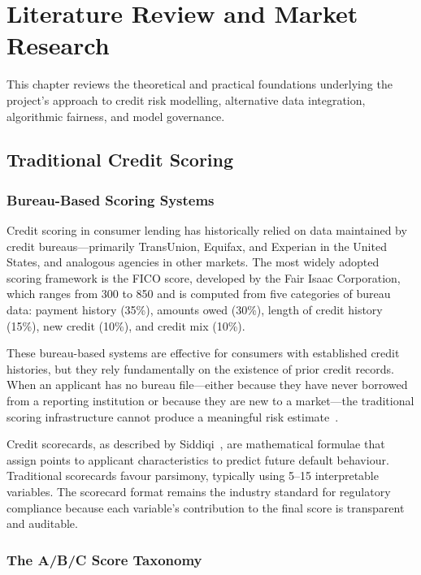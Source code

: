 \chapter{Literature Review and Market Research}
\label{chap:litreview}

This chapter reviews the theoretical and practical foundations underlying the project's approach to credit risk modelling, alternative data integration, algorithmic fairness, and model governance.

\section{Traditional Credit Scoring}
\label{sec:traditional_scoring}

\subsection{Bureau-Based Scoring Systems}

Credit scoring in consumer lending has historically relied on data maintained by credit bureaus---primarily TransUnion, Equifax, and Experian in the United States, and analogous agencies in other markets. The most widely adopted scoring framework is the FICO score, developed by the Fair Isaac Corporation, which ranges from 300 to 850 and is computed from five categories of bureau data: payment history (35\%), amounts owed (30\%), length of credit history (15\%), new credit (10\%), and credit mix (10\%).

These bureau-based systems are effective for consumers with established credit histories, but they rely fundamentally on the existence of prior credit records. When an applicant has no bureau file---either because they have never borrowed from a reporting institution or because they are new to a market---the traditional scoring infrastructure cannot produce a meaningful risk estimate~\cite{cfpb2022}.

Credit scorecards, as described by Siddiqi~\cite{siddiqi2012}, are mathematical formulae that assign points to applicant characteristics to predict future default behaviour. Traditional scorecards favour parsimony, typically using 5--15 interpretable variables. The scorecard format remains the industry standard for regulatory compliance because each variable's contribution to the final score is transparent and auditable.

\subsection{The A/B/C Score Taxonomy}

